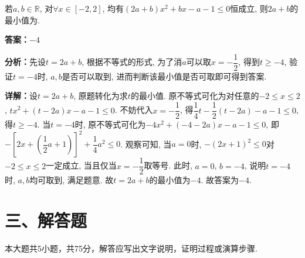 \begin{question}[points=5]
若$a, b \in \mathbb{R}$, 对$\forall x \in [-2, 2]$, 均有$(2a+b)x^2 + bx - a - 1 \le 0$恒成立, 则$2a+b$的最小值为.
\fillin[{$-4$}]
\begin{solution}
\textbf{答案：}$-4$

\textbf{分析：}先设$t = 2a + b$, 根据不等式的形式, 为了消$a$可以取$x = -\dfrac{1}{2}$, 得到$t \ge -4$, 验证$t = -4$时, $a, b$是否可以取到, 进而判断该最小值是否可取即可得到答案.

\textbf{详解：}设$t = 2a + b$, 原题转化为求$t$的最小值. 原不等式可化为对任意的$-2 \le x \le 2$, $tx^2 + (t - 2a)x - a - 1 \le 0$. 不妨代入$x = -\dfrac{1}{2}$, 得$\dfrac{1}{4}t - \dfrac{1}{2}(t - 2a) - a - 1 \le 0$, 得$t \ge -4$. 当$t = -4$时, 原不等式可化为$-4x^2 + (-4 - 2a)x - a - 1 \le 0$, 即$-\left[2x + \left(\dfrac{1}{2}a + 1\right)\right]^2 + \dfrac{1}{4}a^2 \le 0$. 观察可知, 当$a = 0$时, $-(2x+1)^2 \le 0$对$-2 \le x \le 2$一定成立, 当且仅当$x = -\dfrac{1}{2}$取等号. 此时, $a=0$, $b=-4$, 说明$t=-4$时, $a,b$均可取到, 满足题意. 故$t = 2a + b$的最小值为$-4$. 故答案为$-4$.
\end{solution}
\end{question}

\section*{三、解答题}
本大题共5小题，共75分，解答应写出文字说明，证明过程或演算步骤.

